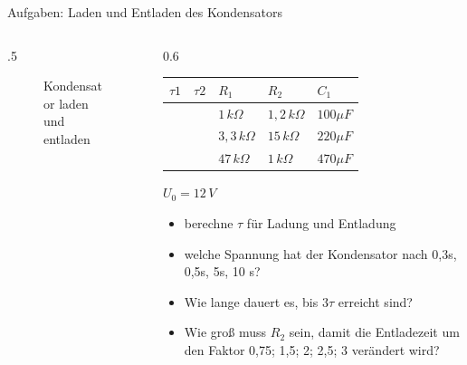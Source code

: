 \begin{frame}{Aufgaben: Laden und Entladen des Kondensators}
    \begin{columns}
      \begin{column}{.5\textwidth}
        \begin{figure}[htb]
        \caption{Kondensator laden und entladen}
        \label{fig:StromkreisCLadenEntladen1}
      \end{figure}
    \end{column}
    \begin{column}{0.6\textwidth}
    \begin{tabular}{|l|l|l|l|l|}
      \hline
     $\tau 1$& $\tau 2$ & $R_1$& $R_2$& $C_1$\\ \hline
     &  & $1\, k\Omega$& $1,2\, k\Omega$& $100\mu F$\\ \hline
     &  & $3,3\, k\Omega$& $15\, k\Omega$& $220\mu F$\\ \hline
     &  & $47\, k\Omega$& $1\, k\Omega$& $470\mu F$\\ \hline
    \end{tabular}

    $U_0 = 12\,V$

    \begin{itemize}
     \item berechne $\tau$ für Ladung und Entladung
     \item welche Spannung hat der Kondensator nach 0,3s, 0,5s, 5s, 10 s?
     \item Wie lange dauert es, bis $3\tau$ erreicht sind?
     \item Wie groß muss $R_2$ sein, damit die Entladezeit um den Faktor 0,75; 1,5; 2; 2,5; 3 verändert wird?
    \end{itemize}
    \end{column}
  \end{columns}
\end{frame}


